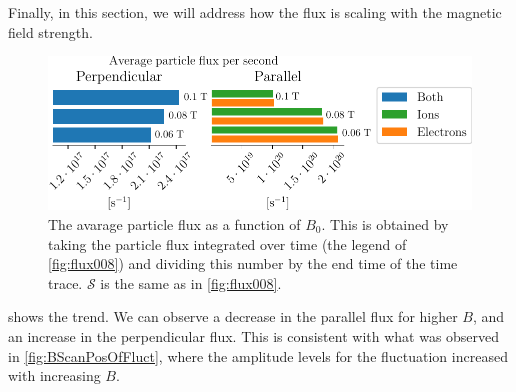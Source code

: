 Finally, in this section, we will address how the flux is scaling with the magnetic field strength.
%
\begin{figure}[htb]
    \centering
    \includegraphics{fig/results/bScan/BScanTotalFlux}
    \caption{
        The avarage particle flux as a function of $B_0$.
        This is obtained by taking the particle flux integrated over time (the legend of \cref{fig:flux008}) and dividing this number by the end time of the time trace.
        $\mathcal{S}$ is the same as in \cref{fig:flux008}.
    }
    \label{fig:BScanTotalFlux}
\end{figure}
%
 shows the trend.
We can observe a decrease in the parallel flux for higher $B$, and an increase in the perpendicular flux.
This is consistent with what was observed in \cref{fig:BScanPosOfFluct}, where the amplitude levels for the fluctuation increased with increasing $B$.
